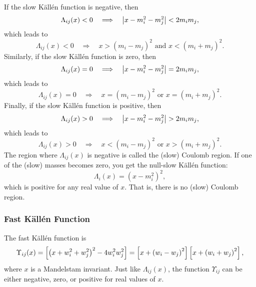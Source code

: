 If the slow K\"{a}ll\'{e}n function is negative, then
\begin{equation}
	\Lambda_{ij}(x) < 0 \quad \Longrightarrow \quad \left\lvert x - m_{i}^{2} - m_{j}^{2} \right\rvert < 2 m_{i} m_{j},
\end{equation}
which leads to
\begin{equation}
	\Lambda_{ij}(x) < 0 \quad \Longrightarrow \quad x > \left(m_{i} - m_{j}\right)^{2} \text{ and } x < \left(m_{i} + m_{j}\right)^{2}.
\end{equation}
Similarly, if the slow K\"{a}ll\'{e}n function is zero, then
\begin{equation}
	\Lambda_{ij}(x) = 0 \quad \Longrightarrow \quad \left\lvert x - m_{i}^{2} - m_{j}^{2} \right\rvert = 2 m_{i} m_{j},
\end{equation}
which leads to
\begin{equation}
	\Lambda_{ij}(x) = 0 \quad \Longrightarrow \quad x = \left(m_{i} - m_{j}\right)^{2} \text{ or } x = \left(m_{i} + m_{j}\right)^{2}.
\end{equation}
Finally, if the slow K\"{a}ll\'{e}n function is positive, then
\begin{equation}
	\Lambda_{ij}(x) > 0 \quad \Longrightarrow \quad \left\lvert x - m_{i}^{2} - m_{j}^{2} \right\rvert > 2 m_{i} m_{j},
\end{equation}
which leads to
\begin{equation}
	\Lambda_{ij}(x) > 0 \quad \Longrightarrow \quad x < \left(m_{i} - m_{j}\right)^{2} \text{ or } x > \left(m_{i} + m_{j}\right)^{2}.
\end{equation}
The region where $\Lambda_{ij}(x)$ is negative is called the (slow) Coulomb region. If one of the (slow) masses becomes zero, you get the null-slow K\"{a}ll\'{e}n function:
\begin{equation}
	\Lambda_{i}(x) = \left( x - m_{i}^{2} \right)^{2},
\end{equation}
which is positive for any real value of $x$. That is, there is no (slow) Coulomb region.
\subsubsection{Fast K\"{a}ll\'{e}n Function}
The fast K\"{a}ll\'{e}n function is
\begin{equation}
	\Upsilon_{ij}(x) = \left[ \left(x + w_{i}^{2} + w_{j}^{2} \right)^{2} - 4 w_{i}^{2} w_{j}^{2} \right] = \left[ x + \left( w_{i} - w_{j} \right)^{2} \right] \left[ x + \left( w_{i} + w_{j} \right)^{2} \right],
\end{equation}
where $x$ is a Mandelstam invariant. Just like $\Lambda_{ij}(x)$, the function $\Upsilon_{ij}$ can be either negative, zero, or positive for real values of $x$.

